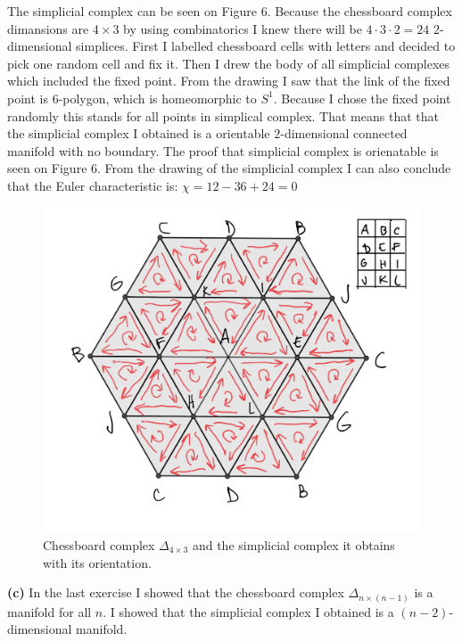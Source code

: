 \documentclass[12pt]{article}
\begin{document}
	The simplicial complex can be seen on Figure 6. Because the chessboard complex dimansions are $4 \times 3$ by using combinatorics I knew there will be $4 \cdot 3 \cdot 2 = 24$ 2-dimensional simplices. First I labelled chessboard cells with letters and decided to pick one random cell and fix it. Then I drew the body of all simplicial complexes which included the fixed point. From the drawing I saw that the link of the fixed point is 6-polygon, which is homeomorphic to $S^1$. Because I chose the fixed point randomly this stands for all points in simplical complex. That means that  that the simplicial complex I obtained is a orientable $2$-dimensional connected manifold with no boundary. The proof that simplicial complex is orienatable is seen on Figure 6. From the drawing of the simplicial complex I can also conclude that the Euler characteristic is: $\chi = 12 - 36 + 24= 0$ \\
	
	\begin{figure}
		\centering
		\includegraphics[scale=0.20] {graf6}
		\caption{\label{fig:6} Chessboard complex $\Delta_{4 \times 3}$ and the simplicial complex it obtains with its orientation. }
	\end{figure}
	
	\textbf{(c)} In the last exercise I showed that the chessboard complex $\Delta_{n \times (n-1)}$ is a manifold for all $n$. I showed that the simplicial complex I obtained is a $(n-2)$-dimensional manifold. \\
	
\end{document}
